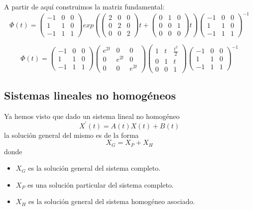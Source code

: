 \documentclass{mathnotes}
\begin{document}
\begin{example}
A partir de aquí construimos la matriz fundamental:
$$\Phi(t) = \begin{pmatrix}
-1 & 0 & 0\\ 1 & 1 & 0\\-1& 1& 1
\end{pmatrix}exp(\begin{pmatrix}
2 & 0 & 0\\ 0 & 2 & 0\\0& 0& 2
\end{pmatrix}t+\begin{pmatrix}
0 & 1 & 0\\ 0 & 0 & 1\\0& 0& 0
\end{pmatrix}t)\begin{pmatrix}
-1 & 0 & 0\\ 1 & 1 & 0\\-1& 1& 1
\end{pmatrix}^{-1}$$

$$\Phi(t) = \begin{pmatrix}
-1 & 0 & 0\\ 1 & 1 & 0\\-1& 1& 1
\end{pmatrix}\begin{pmatrix}
e^{2t} & 0 & 0\\ 0 & e^{2t} & 0\\0& 0& e^{2t}
\end{pmatrix}\begin{pmatrix}
1 & t & \frac{t^2}{2}\\ 0 & 1 & t\\ 0 & 0 & 1
\end{pmatrix}\begin{pmatrix}
-1 & 0 & 0\\ 1 & 1 & 0\\-1& 1& 1
\end{pmatrix}^{-1}$$

\end{example}

\subsection{Sistemas lineales no homogéneos}
Ya hemos visto que dado un sistema lineal no homogéneo $$X^\prime(t) = A(t)X(t)+B(t)$$ la solución general del mismo es de la forma $$X_G = X_P + X_H$$ donde \begin{itemize}
\item $X_G$ es la solución general del sistema completo.

\item $X_P$ es una solución particular del sistema completo.

\item $X_H$ es la solución general del sistema homogéneo asociado.
\end{itemize}
\end{document}
